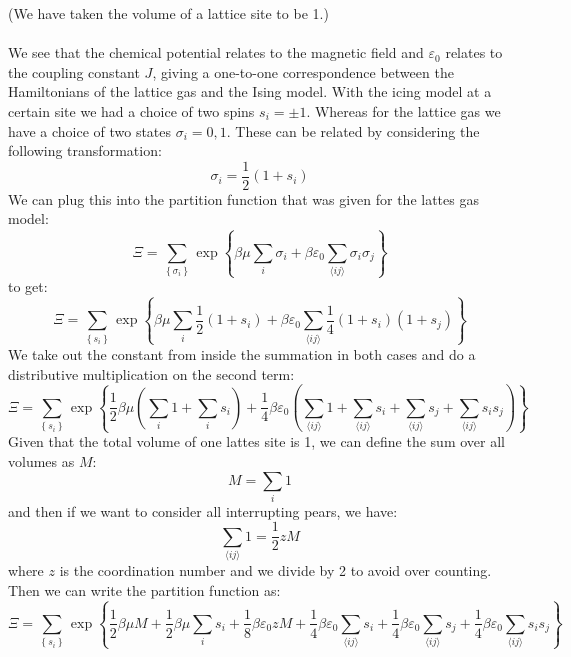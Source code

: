 \documentclass[12pt]{article}
\begin{document}
(We have taken the volume of a lattice site to be 1.)\\\\
We see that the chemical potential relates to the magnetic field and $\varepsilon _{0}$ relates to the coupling constant $J$, giving a one-to-one correspondence between the Hamiltonians of the lattice gas and the Ising model.
With the icing model at a certain site we had a choice of two spins $s _{i} = \pm 1$. Whereas for the lattice gas we have a choice of two states $\sigma _{i} = 0, 1$. These can be related by considering the following transformation:
\begin{equation}
\sigma _{i} = \frac{1}{2} (1 + s _{i})
\end{equation}
We can plug this into the partition function that was given for the lattes gas model:
\begin{equation}
\Xi=\sum_{\left\{\sigma_{i}\right\}} \exp \left\{\beta \mu \sum_{i} \sigma_{i}+\beta \varepsilon_{0} \sum_{\langle i j\rangle} \sigma_{i} \sigma_{j}\right\}
\end{equation}
to get:
\begin{equation}
\Xi=\sum_{\left\{s_{i}\right\}} \exp \left\{\beta \mu \sum_{i} \frac{1}{2} (1 + s_{i})+\beta \varepsilon_{0} \sum_{\langle i j\rangle} \frac{1}{4} (1 + s_{i})(1 + s_{j})\right\}
\end{equation}
We take out the constant from inside the summation in both cases and do a distributive multiplication on the second term:
\begin{equation}
\Xi=\sum_{\left\{s_{i}\right\}} \exp \left\{\frac{1}{2} \beta \mu \left( \sum_{i} 1 + \sum_{i} s_{i}\right)+\frac{1}{4} \beta \varepsilon_{0} \left( \sum_{\langle i j\rangle} 1 + \sum_{\langle i j\rangle} s_{i} + \sum_{\langle i j\rangle} s_{j} + \sum_{\langle i j\rangle} s_{i} s_{j}\right)\right\}
\end{equation}
Given that the total volume of one lattes site is 1, we can define the sum over all volumes as $M$:
\begin{equation}
M=\sum_{i} 1
\end{equation}
and then if we want to consider all interrupting pears, we have:
\begin{equation}
\sum_{\langle i j\rangle} 1 = \frac{1}{2} z M
\end{equation}
where $z$ is the coordination number and we divide by 2 to avoid over counting. 
Then we can write the partition function as:
\begin{equation}
\Xi=\sum_{\left\{s_{i}\right\}} \exp \left\{\frac{1}{2} \beta \mu M + \frac{1}{2} \beta \mu \sum_{i} s_{i} + \frac{1}{8} \beta \varepsilon_{0} z M + \frac{1}{4} \beta \varepsilon_{0} \sum_{\langle i j\rangle} s_{i} + \frac{1}{4} \beta \varepsilon_{0} \sum_{\langle i j\rangle} s_{j} + \frac{1}{4} \beta \varepsilon_{0} \sum_{\langle i j\rangle} s_{i} s_{j}\right\}
\end{equation}
\end{document}
